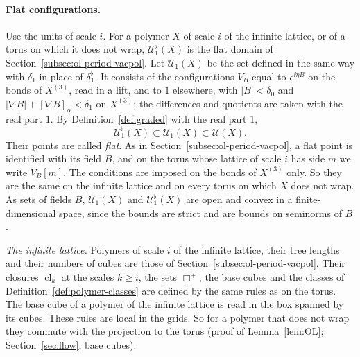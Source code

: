 \paragraph{Flat configurations.} Use the units of scale $i$. For a polymer $X$ of scale $i$ of the infinite lattice, or of a torus on which it does not wrap, $\mathcal U^\flat_1(X)$ is the flat domain of Section~\ref{subsec:ol-period-vacpol}. Let $\mathcal U_1(X)$ be the set defined in the same way with $\delta_1$ in place of $\delta_1^\flat$. It consists of the configurations $V_B$ equal to $e^{\ii\eta B}$ on the bonds of $X^{(3)}$, read in a lift, and to $1$ elsewhere, with $|B|<\delta_0$ and $|\nabla B|+[\nabla B]_\alpha<\delta_1$ on $X^{(3)}$; the differences and quotients are taken with the real part $1$. By Definition~\ref{def:graded} with the real part $1$,
\[
\mathcal U^\flat_1(X)\subset\mathcal U_1(X)\subset\mathcal U(X).
\]
Their points are called \emph{flat}. As in Section~\ref{subsec:ol-period-vacpol}, a flat point is identified with its field $B$, and on the torus whose lattice of scale $i$ has side $m$ we write $V_B[m]$. The conditions are imposed on the bonds of $X^{(3)}$ only. So they are the same on the infinite lattice and on every torus on which $X$ does not wrap. As sets of fields $B$, $\mathcal U_1(X)$ and $\mathcal U^\flat_1(X)$ are open and convex in a finite-dimensional space, since the bounds are strict and are bounds on seminorms of $B$.

\emph{The infinite lattice.} Polymers of scale $i$ of the infinite lattice, their tree lengths and their numbers of cubes are those of Section~\ref{subsec:ol-period-vacpol}. Their closures $\operatorname{cl}_k$ at the scales $k\ge i$, the sets $\Box^+$, the base cubes and the classes of Definition~\ref{def:polymer-classes} are defined by the same rules as on the torus. The base cube of a polymer of the infinite lattice is read in the box spanned by its cubes. These rules are local in the grids. So for a polymer that does not wrap they commute with the projection to the torus (proof of Lemma~\ref{lem:OL}; Section~\ref{sec:flow}, base cubes).

